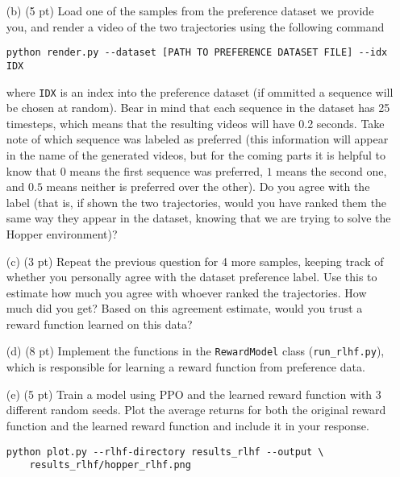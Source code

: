 \documentclass{article}
\begin{document}
\begin{enumerate}
\item[(b) (5 pt)] Load one of the samples from the preference dataset we provide you, and render a video of the two trajectories using the following command

\begin{tcolorbox}
\begin{verbatim}
python render.py --dataset [PATH TO PREFERENCE DATASET FILE] --idx IDX
\end{verbatim}
\end{tcolorbox}

where \texttt{IDX} is an index into the preference dataset (if ommitted a sequence will be chosen at random). Bear in mind that each sequence in the dataset has 25 timesteps, which means that the resulting videos will have 0.2 seconds. Take note of which sequence was labeled as preferred (this information will appear in the name of the generated videos, but for the coming parts it is helpful to know that $0$ means the first sequence was preferred, $1$ means the second one, and $0.5$ means neither is preferred over the other). Do you agree with the label (that is, if shown the two trajectories, would you have ranked them the same way they appear in the dataset, knowing that we are trying to solve the Hopper environment)?

\item[(c) (3 pt)] Repeat the previous question for 4 more samples, keeping track of whether you personally agree with the dataset preference label. Use this to estimate how much you agree with whoever ranked the trajectories. How much did you get? Based on this agreement estimate, would you trust a reward function learned on this data?

\item[(d) (8 pt)] Implement the functions in the \texttt{RewardModel} class  (\texttt{run\_rlhf.py}), which is responsible for learning a reward function from preference data.

\item[(e) (5 pt)] Train a model using PPO and the learned reward function with 3 different random seeds. Plot the average returns for both the original reward function and the learned reward function and include it in your response.

\begin{tcolorbox}
\begin{verbatim}
python plot.py --rlhf-directory results_rlhf --output \
    results_rlhf/hopper_rlhf.png
\end{verbatim}
\end{tcolorbox}


\end{enumerate}
\end{document}
